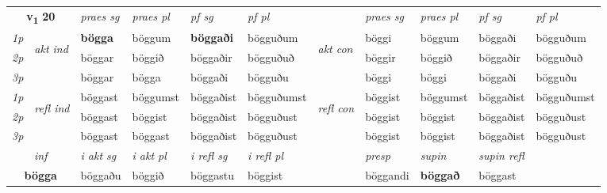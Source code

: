 \noindent
\begin{tabular}{lllllllllll} \toprule
\multicolumn{2}{c}{\textbf{v{\textsubscript{1}}} \Large{\textbf{20}}}  &  \textit{praes sg}  & \textit{praes pl}  &\textit{ pf sg} & \textit{pf pl} &  &  \textit{praes sg}  & \textit{praes pl}  & \textit{pf sg} & \textit{pf pl } \\*
	\cmidrule{3-6} \cmidrule{8-11}
 {\textit{1p}} & \multirow{3}{*}{\begin{turn}{90}\textit{akt ind}\end{turn}} & \textbf{bögga} & böggum & \textbf{böggaði} & bögguðum & \multirow{3}{*}{\begin{turn}{90}\textit{akt con}\end{turn}} &böggi & böggum & böggaði & bögguðum\\*
 {\textit{2p}} &  &  böggar  & böggið & böggaðir & bögguðuð & & böggir & böggið & böggaðir & bögguðuð \\*
{\textit{3p}} &  & böggar & bögga & böggaði & bögguðu & & böggi & böggi& böggaði & bögguðu \\*
\cmidrule{3-6} \cmidrule{8-11}
 {\textit{1p}} & \multirow{3}{*}{\begin{turn}{90}\textit{refl ind}\end{turn}}  & böggast & böggumst & böggaðist & bögguðumst & \multirow{3}{*}{\begin{turn}{90}\textit{refl con}\end{turn}}  &böggist & böggumst & böggaðist & bögguðumst \\*
 {\textit{2p}} &  & böggast & böggist & böggaðist & bögguðust & &böggist & böggist & böggaðist & bögguðust \\*
 {\textit{3p}}  & & böggast & böggast & böggaðist & bögguðust & & böggist & böggist& böggaðist & bögguðust \\*
\cmidrule{3-6} \cmidrule{8-11}

   \multicolumn{2}{c}{\textit{inf}}  & \textit{i akt sg} & \textit{i akt pl} & \textit{i refl sg} & \textit{i refl pl} && \textit{presp} & \textit{supin} & \textit{supin refl}  \\*
  \multicolumn{2}{c}{\textbf{bögga}} & böggaðu  & böggið & böggastu & böggist && böggandi &  \textbf{böggað} & böggast  \\*
\end{tabular}

